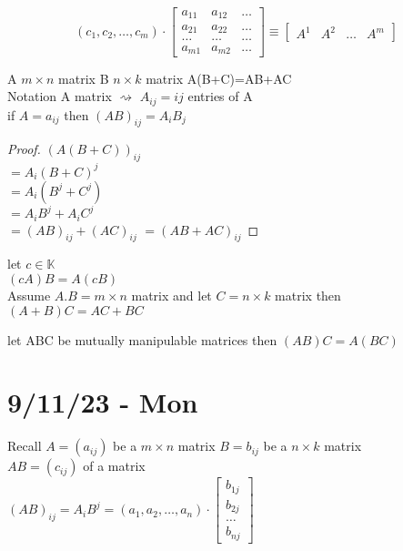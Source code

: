 \documentclass{article}
\newcommand\m[1]{\begin{bmatrix}#1\end{bmatrix}}
\newcommand{\cd}{\cdot}
\newcommand{\mn}{m \times n}
\begin{document}
$$(c_1,c_2,\dots,c_m)\cd\m{a_{11}&a_{12}&\dots\\a_{21}&a_{22}&\dots\\\dots&\dots&\dots\\a_{m1}&a_{m2}&\dots}\equiv \m{A^1&A^2&\dots&A^m}$$

\begin{theorem}
    A $\mn$ matrix B $n \times k$ matrix  A(B+C)=AB+AC\\
    Notation A matrix $\rightsquigarrow$ $A_{ij}=ij$ entries of A\\
    if $A=a_{ij}$ then $(AB)_{ij}=A_iB_j$
\end{theorem}
\begin{proof}
$    (A(B+C))_{ij}$\\
$=A_i(B+C)^j$\\
$=A_i(B^j+C^j)$\\
$=A_iB^j+A_iC^j$\\
$=(AB)_{ij}+(AC)_{ij}$
$=(AB+AC)_{ij}$
\end{proof}
\begin{theorem}
    let $c \in \mathbb{K}$
    \\$(cA)B=A(cB)$\\Assume $A.B=m \times n$ matrix and let $C=n\times k$ matrix then $(A+B)C=AC+BC$
\end{theorem}
\begin{theorem}
    let ABC be mutually manipulable matrices  then $(AB)C=A(BC)$
    
\end{theorem}

\section{9/11/23 - Mon}

Recall $A=(a_{ij})$ be a $\mn$ matrix
$B=b_{ij}$ be a $n\times k$ matrix
\\$AB=(c_{ij})$ of a matrix\\
$(AB)_{ij}=A_iB^j=(a_1,a_2,\dots,a_n)\cd \m{b_{1j}\\b_{2j}\\\dots \\b_{nj}}$
\end{document}
